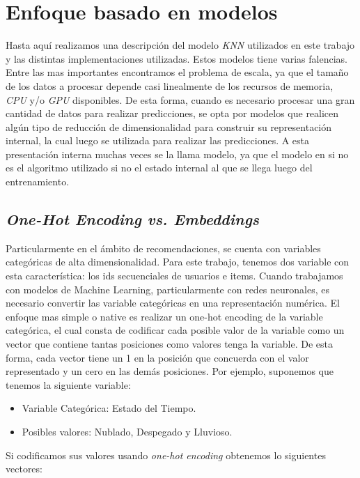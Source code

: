 \documentclass[11pt,a4paper,twoside]{thesis}
\begin{document}
\section{Enfoque basado en modelos}

Hasta aquí realizamos una descripción del modelo \textit{KNN} utilizados en este trabajo y las distintas implementaciones utilizadas. Estos modelos tiene varias falencias. Entre las mas importantes encontramos el problema de escala, ya que el tamaño de los datos a procesar depende casi linealmente de los recursos de memoria, \textit{CPU} y/o \textit{GPU} disponibles. De esta forma, cuando es necesario procesar una gran cantidad de datos para realizar predicciones, se opta por modelos que realicen algún tipo de reducción de dimensionalidad para construir su representación internal, la cual luego se utilizada para realizar las predicciones. A esta presentación interna muchas veces se la llama modelo, ya que el modelo en si no es el algoritmo utilizado si no el estado internal al que se llega luego del entrenamiento. 

\subsection{\textit{One-Hot Encoding vs. Embeddings}}

Particularmente en el ámbito de recomendaciones, se cuenta con variables categóricas de alta dimensionalidad. Para este trabajo, tenemos dos variable con esta característica: los ids secuenciales de usuarios e items. Cuando trabajamos con modelos de Machine Learning, particularmente con redes neuronales, es necesario convertir las variable categóricas en una representación numérica. El enfoque mas simple o native es realizar un one-hot encoding de la variable categórica, el cual consta de codificar cada posible valor de la variable como un vector que contiene tantas posiciones como valores tenga la variable. De esta forma, cada vector tiene un 1 en la posición que concuerda con el valor representado y un cero en las demás posiciones. Por ejemplo, suponemos que tenemos la siguiente variable:

\begin{itemize}
	\item Variable Categórica: Estado del Tiempo.
	\item Posibles valores: Nublado, Despegado y Lluvioso.
\end{itemize}


Si codificamos sus valores usando \textit{one-hot encoding} obtenemos lo siguientes vectores:
\end{document}
